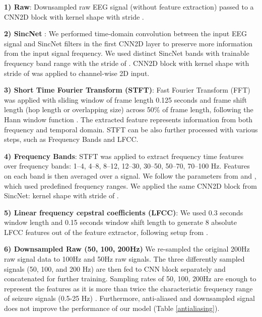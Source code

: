 \documentclass[pmlr,twocolumn,10pt]{jmlr}
\begin{document}
\noindent\textbf{1) Raw}: Downsampled raw EEG signal (without feature extraction) passed to a CNN2D block with kernel shape  with stride .

\noindent\textbf{2) SincNet} \citep{ravanelli2018speaker}: We performed time-domain convolution between the input EEG signal and SincNet filters in the first CNN2D layer to preserve more information from the input signal frequency. We used  distinct SincNet bands with trainable frequency band range with the stride of . CNN2D block with kernel shape  with stride of  was applied to channel-wise 2D input.

\noindent\textbf{3) Short Time Fourier Transform (STFT)}: Fast Fourier Transform (FFT) was applied with sliding window of frame length 0.125 seconds and frame shift length (hop length or overlapping size) across 50\% of frame length, following the Hann window function \citep{oppenheim1999discrete}. The extracted feature represents information from both frequency and temporal domain. STFT can be also further processed with various steps, such as Frequency Bands and LFCC.


\noindent\textbf{4) Frequency Bands}: STFT was applied to extract frequency time features over  frequency bands: 1–4, 4–8, 8–12, 12–30, 30–50, 50–70, 70–100 Hz.
Features on each band is then averaged over a signal.
We follow the parameters from \cite{liu2019epileptic} and \cite{mirowski2009classification}, which used predefined frequency ranges. We applied the same CNN2D block from SincNet: kernel shape  with stride of . 

\noindent\textbf{5) Linear frequency cepstral coefficients (LFCC)}: We used 0.3 seconds window length and 0.15 seconds window shift length to generate 8 absolute LFCC features out of the feature extractor, following setup from \cite{shawki2020deep}.

\noindent\textbf{6) Downsampled Raw (50, 100, 200Hz)} We re-sampled the original 200Hz raw signal data to 100Hz and 50Hz raw signals. The three differently sampled signals (50, 100, and 200 Hz) are then fed to CNN block separately and concatenated for further training. Sampling rates of 50, 100, 200Hz are enough to represent the features as it is more than twice the characteristic frequency range of seizure signals (0.5-25 Hz) \citep{shoeb2009application}. Furthermore, anti-aliased and downsampled signal does not improve the performance of our model (Table \ref{antialiasing}). 
\end{document}

